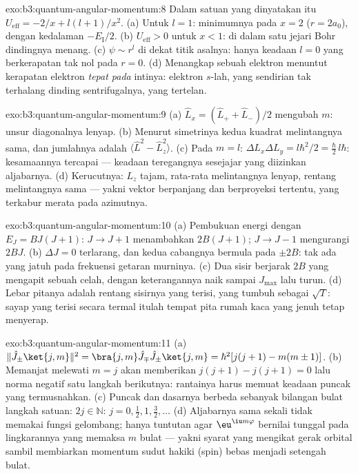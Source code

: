 \begin{solution}{exo:b3:quantum-angular-momentum:8}
Dalam satuan yang dinyatakan itu $U_{\text{eff}} = -2/x + l(l+1)/x^2$. (a) Untuk
$l = 1$: minimumnya pada $x = 2$ ($r = 2a_0$), dengan kedalaman $-E_{\text{I}}/2$.
(b) $U_{\text{eff}} > 0$ untuk $x < 1$: di dalam satu jejari Bohr
dindingnya menang. (c) $\psi \sim r^l$ di dekat titik asalnya: hanya
keadaan $l = 0$ yang berkerapatan tak nol pada $r = 0$. (d) Menangkap
sebuah elektron menuntut kerapatan elektron \emph{tepat pada} intinya:
elektron $s$-lah, yang sendirian tak terhalang dinding sentrifugalnya,
yang tertelan.
\end{solution}

\begin{solution}{exo:b3:quantum-angular-momentum:9}
(a) $\hat L_x = (\hat L_+ + \hat L_-)/2$ mengubah $m$: unsur
diagonalnya lenyap. (b) Menurut simetrinya kedua kuadrat melintangnya
sama, dan jumlahnya adalah $\langle\hat L^2 - \hat L_z^2\rangle$. (c)
Pada $m = l$: $\Delta L_x\Delta L_y = l\hbar^2/2 = \tfrac\hbar2
\,l\hbar$: kesamaannya tercapai --- keadaan teregangnya sesejajar yang
diizinkan aljabarnya. (d) Kerucutnya: $L_z$ tajam, rata-rata
melintangnya lenyap, rentang melintangnya sama --- yakni vektor
berpanjang dan berproyeksi tertentu, yang terkabur merata pada azimutnya.
\end{solution}

\begin{solution}{exo:b3:quantum-angular-momentum:10}
(a) Pembukuan energi dengan $E_J = BJ(J+1)$: $J \to J + 1$ menambahkan
$2B(J+1)$; $J \to J - 1$ mengurangi $2BJ$. (b) $\Delta J = 0$
terlarang, dan kedua cabangnya bermula pada $\pm 2B$: tak ada yang
jatuh pada frekuensi getaran murninya. (c) Dua sisir berjarak $2B$
yang mengapit sebuah celah, dengan keterangannya naik sampai $J_{\max}$
lalu turun. (d) Lebar pitanya adalah rentang sisirnya yang terisi, yang
tumbuh sebagai $\sqrt{T}$: sayap yang terisi secara termal itulah tempat
pita rumah kaca yang jenuh tetap menyerap.
\end{solution}

\begin{solution}{exo:b3:quantum-angular-momentum:11}
(a) $\|\hat J_\pm\ket{j,m}\|^2 = \bra{j,m}\hat J_\mp\hat J_\pm
\ket{j,m} = \hbar^2[j(j+1) - m(m\pm1)]$. (b) Memanjat melewati $m = j$
akan memberikan $j(j+1) - j(j+1) = 0$ lalu norma negatif satu langkah
berikutnya: rantainya harus memuat keadaan puncak yang termusnahkan. (c)
Puncak dan dasarnya berbeda sebanyak bilangan bulat langkah satuan:
$2j \in
\mathbb N$: $j = 0, \tfrac12, 1, \tfrac32, \dots$ (d) Aljabarnya sama
sekali tidak memakai fungsi gelombang; hanya tuntutan agar
$\eu^{\iu m\varphi}$ bernilai tunggal pada lingkarannya yang memaksa $m$
bulat --- yakni syarat yang mengikat gerak orbital sambil membiarkan
momentum sudut hakiki (spin) bebas menjadi setengah bulat.
\end{solution}

